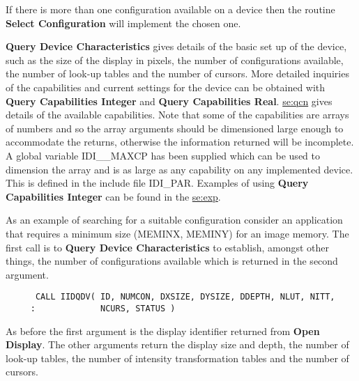 If there is more than one configuration available on a device then the
routine {\bf Select Configuration} will implement the chosen one.

{\bf Query Device Characteristics} gives details of the basic set up
of the device, such as the size of the display in pixels, the number
of configurations available, the number of look-up tables and the number
of cursors. More detailed inquiries of the capabilities and current
settings for the device can be obtained with {\bf Query Capabilities
Integer} and {\bf Query Capabilities Real}.
\hyperref{This appendix}{Appendix~}{}{se:qcn} gives details of the 
available capabilities. Note that
some of the capabilities are arrays of numbers and so the array arguments
should be dimensioned large enough to accommodate the returns, otherwise the
information returned will be incomplete. A global variable IDI\_\_MAXCP
has been supplied which can be used to dimension the array and is
as large as any capability on any implemented device. This is defined
in the include file IDI\_PAR. Examples of using
{\bf Query Capabilities Integer} can be found in the 
\hyperref{test program}{in appendix~}{}{se:exp}.

As an example of searching for a suitable configuration consider an
application that requires a minimum size (MEMINX, MEMINY) for an
image memory. The first call is to {\bf Query Device Characteristics}
to establish, amongst other things, the number of configurations
available which is returned in the second argument.
\begin{small}
\begin{verbatim}
      CALL IIDQDV( ID, NUMCON, DXSIZE, DYSIZE, DDEPTH, NLUT, NITT,
     :             NCURS, STATUS )
\end{verbatim}
\end{small}
As before the first argument is the display identifier returned from
{\bf Open Display}. The other arguments return the display size and
depth, the number of look-up tables, the number of intensity
transformation tables and the number of cursors.

